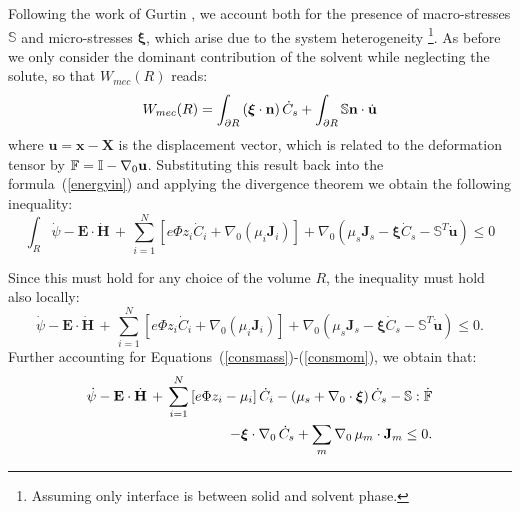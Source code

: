 Following the work of Gurtin \cite{GURTIN}, we account both for the presence of macro-stresses $\mathbb{S}$ and micro-stresses $\boldsymbol{\xi}$, which arise due to the system heterogeneity \cite{microstress}\footnote{Assuming only interface is between solid and solvent phase.}. As before we only consider the dominant contribution of the solvent while neglecting the solute, so that $W_{mec}(R)$ reads:
\begin{equation}	\centering
%	
W_{mec}(R) = \int_{\partial R} \left(\boldsymbol{\xi}\cdot \mathbf{n}\right)\dot{C}_s + \int_{\partial R} \mathbb{S}\mathbf{n} \cdot \dot{\mathbf{u}}
\end{equation}
where $\mathbf{u}= \mathbf{x}-\mathbf{X}$ is the displacement vector, which is related to the deformation tensor by $\mathbb{F}=\mathbb{I}-\nabla_0 \mathbf{u}$. Substituting this result back into the formula~(\ref{energyin}) and applying the divergence theorem we obtain the following inequality:
\begin{equation}
\int_R \dot{\psi} - \mathbf{E}\cdot \dot{\mathbf{H}} \, + \, \sum\limits_{i=1}^{N} \left[e \Phi  z_i \dot{C}_i+ \nabla_0 \left(\mu_i \mathbf{J}_i \right)\right] + \nabla_0 (\mu_s \mathbf{J}_s- \boldsymbol{\xi}\dot{C}_s -\mathbb{S}^T\mathbf{\dot{u}}) \leq 0 
\end{equation}

Since this must hold for any choice of the volume $R$, the inequality must hold also locally:
\begin{equation}
\dot{\psi} - \mathbf{E}\cdot \dot{\mathbf{H}} \, + \, \sum\limits_{i=1}^{N} \left[e \Phi  z_i \dot{C}_i+ \nabla_0 \left(\mu_i \mathbf{J}_i \right)\right] + \nabla_0 (\mu_s \mathbf{J}_s- \boldsymbol{\xi}\dot{C}_s -\mathbb{S}^T\mathbf{\dot{u}}) \leq 0. 
\end{equation}
Further accounting for Equations~(\ref{consmass})-(\ref{consmom}), we obtain that:
\begin{equation}
\begin{aligned}
\dot{\psi} - \mathbf{E}\cdot \dot{\mathbf{H}} \, + \, \sum\limits_{i=1}^{N} \left[e \Phi  z_i - \mu_i\right] \dot{C}_i - (\mu_s + \nabla_0 \cdot \boldsymbol{\xi})\,\dot{C}_s -\mathbb{S}:\dot{\mathbb{F}}\\
-\boldsymbol{\xi} \cdot \nabla_0 \, \dot{C}_s + \sum\limits_{m} \nabla_0 \, \mu_m \cdot \mathbf{J}_m \leq 0.
\label{temp2}
\end{aligned} 
\end{equation}

